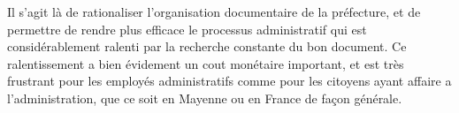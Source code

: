 Il s'agit là de rationaliser l'organisation documentaire de la préfecture, et de permettre de rendre plus efficace le processus administratif qui est considérablement ralenti par la recherche constante du bon document. Ce ralentissement a bien évidement un cout monétaire important, et est très frustrant pour les employés administratifs comme pour les citoyens ayant affaire a l'administration, que ce soit en Mayenne ou en France de façon générale. 

